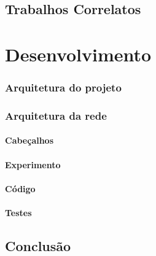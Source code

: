 \documentclass[12pt,
openright, 
oneside,
a4paper,
brazil]{facom-ufu-abntex2}
\begin{document}
\section{Trabalhos Correlatos}


\chapter{Desenvolvimento}
 
\subsection{Arquitetura do projeto}
\subsection{Arquitetura da rede}
\subsubsection{Cabeçalhos}
\subsubsection{Experimento}
\subsubsection{Código}
\subsubsection{Testes}

\section{Conclusão}





\end{document}
